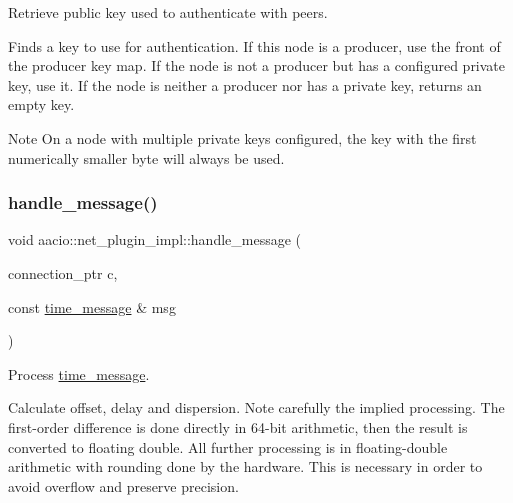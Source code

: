 Retrieve public key used to authenticate with peers. 

Finds a key to use for authentication. If this node is a producer, use the front of the producer key map. If the node is not a producer but has a configured private key, use it. If the node is neither a producer nor has a private key, returns an empty key.

\begin{DoxyNote}{Note}
On a node with multiple private keys configured, the key with the first numerically smaller byte will always be used. 
\end{DoxyNote}
\mbox{\label{classaacio_1_1net__plugin__impl_acb86ea89d6a903fb512c5afc5f6719e0}} 
\subsubsection{\texorpdfstring{handle\+\_\+message()}{handle\_message()}}
{\footnotesize\ttfamily void aacio\+::net\+\_\+plugin\+\_\+impl\+::handle\+\_\+message (\begin{DoxyParamCaption}\item[{connection\+\_\+ptr}]{c,  }\item[{const \mbox{\hyperlink{structaacio_1_1time__message}{time\+\_\+message}} \&}]{msg }\end{DoxyParamCaption})}



Process \mbox{\hyperlink{structaacio_1_1time__message}{time\+\_\+message}}. 

Calculate offset, delay and dispersion. Note carefully the implied processing. The first-\/order difference is done directly in 64-\/bit arithmetic, then the result is converted to floating double. All further processing is in floating-\/double arithmetic with rounding done by the hardware. This is necessary in order to avoid overflow and preserve precision. \mbox{\label{classaacio_1_1net__plugin__impl_a3bd802a5735b37c5961a01247b0db2a0}} 
